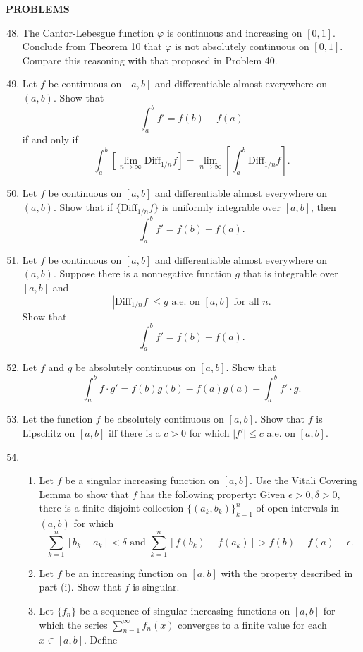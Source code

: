 \begin{center}
	\textbf{PROBLEMS}
\end{center}
\begin{enumerate}
	\setcounter{enumi}{47}
    \item The Cantor-Lebesgue function $\varphi$ is continuous and increasing on $[0,1]$. Conclude from Theorem 10 that $\varphi$ is not absolutely continuous on $[0,1]$.
    Compare this reasoning with that proposed in Problem 40.
    \item Let $f$ be continuous on $[a,b]$ and differentiable almost everywhere on $(a,b)$. Show that 
    \[
        \int_a^bf'=f(b)-f(a)  
    \]
    if and only if 
    \[
        \int_a^b[\lim_{n\to\infty}\text{Diff}_{1/n}f]=\lim_{n\to\infty}[\int_a^b\text{Diff}_{1/n}f].
    \]
    \item Let $f$ be continuous on $[a,b]$ and differentiable almost everywhere on $(a,b)$. Show that if $\{\text{Diff}_{1/n}f\}$ is uniformly integrable over $[a,b]$, then
    \[
        \int_a^bf'=f(b)-f(a).  
    \]
    \item Let $f$ be continuous on $[a,b]$ and differentiable almost everywhere on $(a,b)$. Suppose there is a nonnegative function $g$ that is integrable over $[a,b]$ and 
    \[
        |\text{Diff}_{1/n}f|\le g\text{ a.e. on }[a,b]\text{ for all }n.  
    \]
    Show that 
    \[
        \int_a^bf'=f(b)-f(a).  
    \]
    \item Let $f$ and $g$ be absolutely continuous on $[a,b]$. Show that
    \[
        \int_a^bf\cdot g'=f(b)g(b)-f(a)g(a)-\int_a^bf'\cdot g.  
    \] 
    \item Let the function $f$ be absolutely continuous on $[a,b]$. Show that $f$ is Lipschitz on $[a,b]$ iff there is a $c>0$ for which $|f'|\le c$ a.e. on $[a,b]$.
    \item 
    \begin{enumerate}[label=(\roman*),align=left]
        \item Let $f$ be a singular increasing function on $[a,b]$. Use the Vitali Covering Lemma to show that $f$ has the following property: Given $\epsilon>0,\delta>0$, there is a finite disjoint collection $\{(a_k,b_k)\}_{k=1}^n$ of open intervals in $(a,b)$ for which
        \[
            \sum_{k=1}^n[b_k-a_k]<\delta\text{ and }\sum_{k=1}^n[f(b_k)-f(a_k)]>f(b)-f(a)-\epsilon.  
        \]
        \item Let $f$ be an increasing function on $[a,b]$ with the property described in part (i). Show that $f$ is singular.
        \item Let $\{f_n\}$ be a sequence of singular increasing functions on $[a,b]$ for which the series $\sum_{n=1}^\infty f_n(x)$ converges to a finite value for each $x\in[a,b]$. Define 

\end{enumerate}
\end{enumerate}
